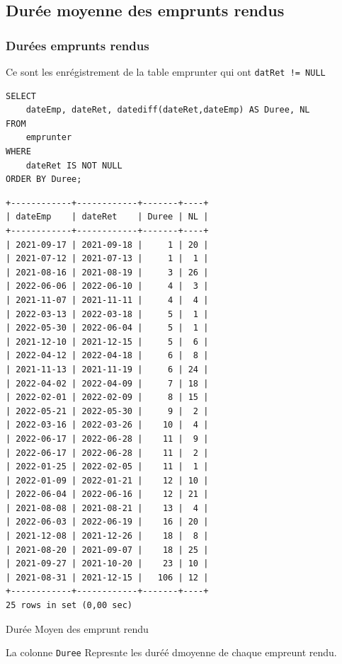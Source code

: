 \documentclass{article}
\begin{document}
\subsection{Durée moyenne des emprunts rendus}
\subsubsection{Durées emprunts rendus}
Ce sont les enrégistrement de la table emprunter qui ont \texttt{datRet != NULL}
\begin{center}
\begin{minipage}{0.7\linewidth}
\begin{listing}[H]
\begin{verbatim}
SELECT 
    dateEmp, dateRet, datediff(dateRet,dateEmp) AS Duree, NL
FROM
    emprunter
WHERE
    dateRet IS NOT NULL
ORDER BY Duree;
\end{verbatim}
\begin{verbatim}
+------------+------------+-------+----+
| dateEmp    | dateRet    | Duree | NL |
+------------+------------+-------+----+
| 2021-09-17 | 2021-09-18 |     1 | 20 |
| 2021-07-12 | 2021-07-13 |     1 |  1 |
| 2021-08-16 | 2021-08-19 |     3 | 26 |
| 2022-06-06 | 2022-06-10 |     4 |  3 |
| 2021-11-07 | 2021-11-11 |     4 |  4 |
| 2022-03-13 | 2022-03-18 |     5 |  1 |
| 2022-05-30 | 2022-06-04 |     5 |  1 |
| 2021-12-10 | 2021-12-15 |     5 |  6 |
| 2022-04-12 | 2022-04-18 |     6 |  8 |
| 2021-11-13 | 2021-11-19 |     6 | 24 |
| 2022-04-02 | 2022-04-09 |     7 | 18 |
| 2022-02-01 | 2022-02-09 |     8 | 15 |
| 2022-05-21 | 2022-05-30 |     9 |  2 |
| 2022-03-16 | 2022-03-26 |    10 |  4 |
| 2022-06-17 | 2022-06-28 |    11 |  9 |
| 2022-06-17 | 2022-06-28 |    11 |  2 |
| 2022-01-25 | 2022-02-05 |    11 |  1 |
| 2022-01-09 | 2022-01-21 |    12 | 10 |
| 2022-06-04 | 2022-06-16 |    12 | 21 |
| 2021-08-08 | 2021-08-21 |    13 |  4 |
| 2022-06-03 | 2022-06-19 |    16 | 20 |
| 2021-12-08 | 2021-12-26 |    18 |  8 |
| 2021-08-20 | 2021-09-07 |    18 | 25 |
| 2021-09-27 | 2021-10-20 |    23 | 10 |
| 2021-08-31 | 2021-12-15 |   106 | 12 |
+------------+------------+-------+----+
25 rows in set (0,00 sec)
\end{verbatim}
\caption{Durée Moyen des emprunt rendu}
\end{listing}
\end{minipage}
\end{center}
La colonne \texttt{Duree} Represnte les duréé dmoyenne de chaque empreunt rendu.
\end{document}
